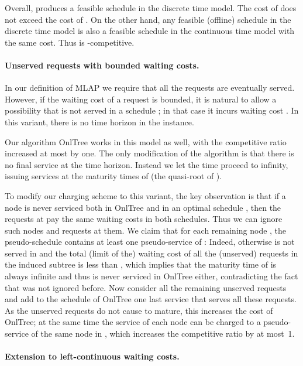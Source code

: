 \documentclass[a4paper]{article}
\newcommand{\OnAlgTreesGeneral}{{\sc OnlTree}}
\newcommand{\MLAP}{\mbox{\rm\textsf{MLAP}}}
\begin{document}
Overall,  produces a feasible schedule in the discrete time model. 
The cost of  does not exceed the cost of
.  On the other hand, any feasible (offline) schedule 
in the discrete time model is also a feasible schedule in the
continuous time model with the same cost. Thus  is
-competitive.


\paragraph{Unserved requests with bounded waiting costs.}

In our definition of {\MLAP} we require that all the requests are
eventually served. However, if the waiting cost of a request  is
bounded, it is natural to allow a possibility that  is not
served in  a schedule ; in that case it incurs waiting cost 
. In
this variant, there is no time horizon in the instance.

Our algorithm {\OnAlgTreesGeneral} works in this model as well, with
the competitive ratio increased at most by one. The only modification of
the algorithm is that there is no final service at the time
horizon.  Instead we let the time proceed to infinity, issuing
services at the maturity times of  (the quasi-root of ). 

To modify our charging scheme to this variant, the key observation is
that if a node  is never serviced both in {\OnAlgTreesGeneral}
and in an optimal schedule , then the requests at  pay
the same waiting costs in both schedules. Thus we can ignore such
nodes and requests at them. We claim that for each remaining node
, the pseudo-schedule  contains at least one
pseudo-service of : Indeed, otherwise  is not served in
 and the total (limit of the) waiting cost of all the
(unserved) requests in the induced subtree  is less than ,
which implies that the maturity time of  is always infinite and
thus  is never serviced in {\OnAlgTreesGeneral} either,
contradicting the fact that  was not ignored before. Now consider
all the remaining unserved requests and add to the schedule of
{\OnAlgTreesGeneral} one last service that serves all these requests.
As the unserved requests do not cause  to mature, this increases
the cost of {\OnAlgTreesGeneral}; at the same time the service of
each node can be charged to a pseudo-service of the same node
in , which increases the competitive ratio by at most~1.


\paragraph{Extension to left-continuous waiting costs.}  
\end{document}
